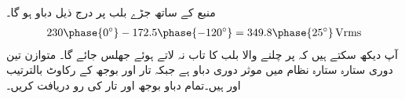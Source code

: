 منبع  کے ساتھ جڑے بلب پر درج ذیل دباو ہو گا۔
\begin{align*}
230\phase{0^{\circ}}-172.5\phase{-120^{\circ}}=349.8\phase{25^{\circ}}\,\si{\volt\rms}
\end{align*}
آپ دیکھ سکتے ہیں کہ  پر چلنے والا بلب  کا تاب نہ لاتے ہوئے جھلس جائے گا۔
متوازن تین دوری ستارہ ستارہ  نظام میں موثر دوری دباو  ہے جبکہ تار اور بوجھ کے رکاوٹ بالترتیب  اور   ہیں۔تمام دباو بوجھ اور تار کی رو دریافت کریں۔

